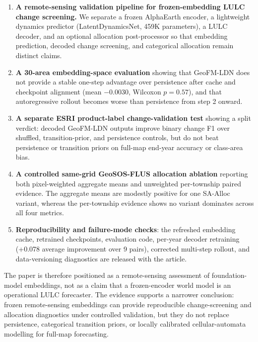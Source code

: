 \documentclass{article}
\begin{document}
\begin{enumerate}
\item \textbf{A remote-sensing validation pipeline for frozen-embedding LULC change screening.} We separate a frozen AlphaEarth encoder, a lightweight dynamics predictor (LatentDynamicsNet, 459K parameters), a LULC decoder, and an optional allocation post-processor so that embedding prediction, decoded change screening, and categorical allocation remain distinct claims.

\item \textbf{A 30-area embedding-space evaluation} showing that GeoFM-LDN does not provide a stable one-step advantage over persistence after cache and checkpoint alignment (mean $-0.0030$, Wilcoxon $p=0.57$), and that autoregressive rollout becomes worse than persistence from step 2 onward.

\item \textbf{A separate ESRI product-label change-validation test} showing a split verdict: decoded GeoFM-LDN outputs improve binary change F1 over shuffled, transition-prior, and persistence controls, but do not beat persistence or transition priors on full-map end-year accuracy or class-area bias.

\item \textbf{A controlled same-grid GeoSOS-FLUS allocation ablation} reporting both pixel-weighted aggregate means and unweighted per-township paired evidence. The aggregate means are modestly positive for one SA-Alloc variant, whereas the per-township evidence shows no variant dominates across all four metrics.

\item \textbf{Reproducibility and failure-mode checks}: the refreshed embedding cache, retrained checkpoints, evaluation code, per-year decoder retraining (+0.078 average improvement over 9 pairs), corrected multi-step rollout, and data-versioning diagnostics are released with the article.
\end{enumerate}

The paper is therefore positioned as a remote-sensing assessment of foundation-model embeddings, not as a claim that a frozen-encoder world model is an operational LULC forecaster. The evidence supports a narrower conclusion: frozen remote-sensing embeddings can provide reproducible change-screening and allocation diagnostics under controlled validation, but they do not replace persistence, categorical transition priors, or locally calibrated cellular-automata modelling for full-map forecasting.
\end{document}
